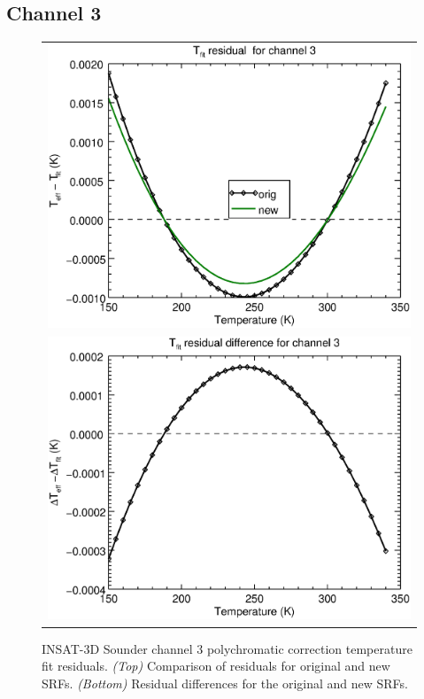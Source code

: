 \subsection{Channel 3}
\begin{figure}[H]
  \centering
  \begin{tabular}{c}
    \includegraphics[scale=0.55]{graphics/sndr/tfit/sndr_insat3d-3.tfit.eps} \\
    \includegraphics[scale=0.55]{graphics/sndr/tfit/sndr_insat3d-3.tfit.difference.eps}
  \end{tabular}
  \caption{INSAT-3D Sounder channel 3 polychromatic correction temperature fit residuals. \emph{(Top)} Comparison of residuals for original and new SRFs. \emph{(Bottom)} Residual differences for the original and new SRFs.}
  \label{fig:sndr_ch3_tfit}
\end{figure}

